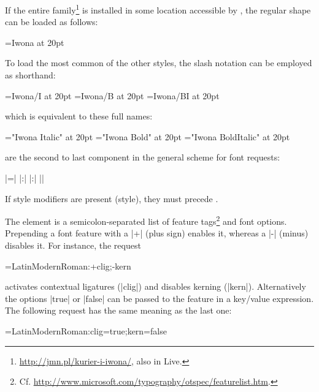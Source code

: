 If the entire  family\footnote{%
  \url{http://jmn.pl/kurier-i-iwona/},
  also in \TEX Live.
}
is installed in some location accessible by ,
the regular shape can be loaded as follows:

\beginlisting
  \font\iwona=Iwona at 20pt
\endlisting

\noindent
To load the most common of the other styles, the slash notation can
be employed as shorthand:

\beginlisting
  \font\iwonaitalic    =Iwona/I    at 20pt
  \font\iwonabold      =Iwona/B    at 20pt
  \font\iwonabolditalic=Iwona/BI   at 20pt
\endlisting

\noindent
which is equivalent to these full names:

\beginlisting
  \font\iwonaitalic    ="Iwona Italic"       at 20pt
  \font\iwonabold      ="Iwona Bold"         at 20pt
  \font\iwonabolditalic="Iwona BoldItalic"   at 20pt
\endlisting

\endsubsubsection
\endsubsection
\endsection


 are the second to last component in the
general scheme for font requests:

\beginnarrower
      |\font\foo={|%
      |:|%
      |:|%
      |}|%
\endnarrower

\noindent
If style modifiers are present (\XETEX style), they must precede
.

The element  is a semicolon-separated list of feature
tags\footnote{%
  Cf. \url{http://www.microsoft.com/typography/otspec/featurelist.htm}.
}
and font options.
%
Prepending a font feature with a |+| (plus sign) enables it, whereas
a |-| (minus) disables it. For instance, the request

\beginlisting
  \font\test=LatinModernRoman:+clig;-kern
\endlisting

\noindent activates contextual ligatures (|clig|) and disables
kerning (|kern|).
%
Alternatively the options |true| or |false| can be passed to
the feature in a key/value expression.
%
The following request has the same meaning as the last one:

\beginlisting
  \font\test=LatinModernRoman:clig=true;kern=false
\endlisting

